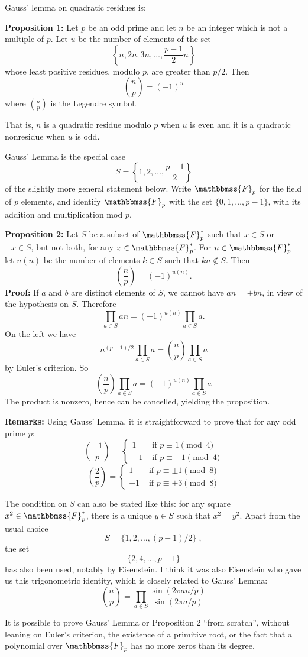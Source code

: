 \documentclass[12pt]{article}
\newcommand{\F}{\mathbbmss{F}}
\newcommand{\legsymp}[1]{\left(\frac{#1}{p}\right)}
\begin{document}

Gauss' lemma on quadratic residues is:

\textbf{Proposition 1:} Let $p$ be an odd prime and let $n$
be an integer which is not a multiple of $p$. Let $u$ be the
number of elements of the set
$$\left\{n,2n,3n,\ldots,\frac{p-1}{2}n\right\}$$
whose least positive residues, modulo $p$, are greater than $p/2$.
Then $$\legsymp{n}=(-1)^u$$
where $\legsymp{n}$ is the Legendre symbol.

That is, $n$ is a quadratic residue modulo
$p$ when $u$ is even and it is a quadratic nonresidue when $u$ is odd.

Gauss' Lemma is the special case
\[S=\left\{1,2,\ldots,\frac{p-1}{2}\right\}\]
of the slightly more general statement below.
Write $\F_p$ for the field of $p$ elements, and
identify $\F_p$ with the set $\{0,1,\ldots,p-1\}$,
with its addition and multiplication mod $p$.

\textbf{Proposition 2:} Let $S$ be a subset of $\F_p^{*}$ such that
$x\in S$ or $-x\in S$, but not both, for any $x\in \F_p^{*}$.
For $n\in \F_p^{*}$ let $u(n)$
be the number of elements $k\in S$ such that $kn\notin S$. Then
$$\legsymp{n} = (-1)^{u(n)}.$$
\textbf{Proof:} If $a$ and $b$ are distinct elements of $S$, we cannot have
$an=\pm bn$, in view of the hypothesis on $S$. Therefore
$$\prod_{a\in S}an=(-1)^{u(n)}\prod_{a\in S}a.$$
On the left we have
$$n^{(p-1)/2}\prod_{a\in S}a=\legsymp{n}\prod_{a\in S}a$$
by Euler's criterion. So
$$\legsymp{n}\prod_{a\in S}a=(-1)^{u(n)}\prod_{a\in S}a$$
The product is nonzero, hence can be cancelled, yielding the proposition.

\textbf{Remarks:} Using Gauss' Lemma, it is straightforward to prove that
for any odd prime $p$:
\[
\legsymp{-1}=
\begin{cases}
1 & \textrm{ if $p\equiv 1\pmod 4$} \\
-1 & \textrm{ if $p\equiv -1\pmod 4$}
\end{cases}
\]
\[
\legsymp{2}=
\begin{cases}
1 & \textrm{ if $p\equiv \pm 1\pmod 8$} \\
-1 & \textrm{ if $p\equiv \pm 3\pmod 8$}
\end{cases}
\]

The condition on $S$ can also be stated like this:
for any square $x^2\in \F_p^{*}$, there is a unique $y\in S$ such
that $x^2=y^2$. Apart from the usual choice
$$S=\{1,2,\ldots,(p-1)/2\}\;,$$
the set
$$\{2,4,\ldots,p-1\}$$ has also been used, notably by Eisenstein.
I think it was also Eisenstein who gave us this trigonometric identity,
which is closely related to Gauss' Lemma:
$$\legsymp{n}=\prod_{a\in S}\frac{\sin{(2\pi an/p)}}{\sin{(2\pi a/p)}}$$

It is possible to prove Gauss' Lemma or Proposition 2 ``from scratch'', without
leaning on Euler's criterion, the existence of a primitive
root, or the fact that a polynomial over $\F_p$ has no more zeros
than its degree.
\end{document}
